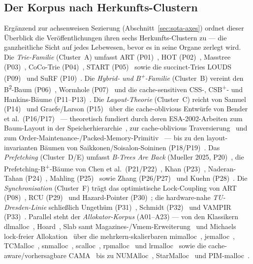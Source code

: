 \subsection{Der Korpus nach Herkunfts-Clustern}\label{ssec:sota-corpus}
Ergänzend zur achsenweisen Sezierung (Abschnitt~\ref{sec:sota-axes}) ordnet dieser Überblick die
Veröffentlichungen ihren sechs Herkunfts-Clustern zu --- die ganzheitliche Sicht auf jedes
Lebewesen, bevor es in seine Organe zerlegt wird. Die \emph{Trie-Familie} (Cluster~A) umfasst ART
(P01)~\cite{leis2013art}, HOT (P02)~\cite{binna2018hot}, Masstree (P03)~\cite{mao2012masstree},
CoCo-Trie (P04)~\cite{boffa2024coco}, START (P05)~\cite{fent2020start} sowie die succinct-Tries
LOUDS (P09)~\cite{jacobson1989louds} und SuRF (P10)~\cite{zhang2018surf}. Die
\emph{Hybrid- und B\textsuperscript{+}-Familie} (Cluster~B) vereint den B\textsuperscript{2}-Baum
(P06)~\cite{schmeisser2022b2tree}, Wormhole (P07)~\cite{wu2019wormhole} und die cache-sensitiven
CSS-, CSB\textsuperscript{+}- und Hankins-Bäume
(P11--P13)~\cite{rao1999css,rao2000csb,hankins2003nodesize}. Die \emph{Layout-Theorie} (Cluster~C)
reicht von Samuel (P14)~\cite{samuel2005procaware} und Graefe/Larson (P15)~\cite{graefe2001btree}
über die cache-oblivious Entwürfe von Bender et
al.\ (P16/P17)~\cite{bender2000cobtree,bender2005coboblivious} --- theoretisch fundiert durch deren
ESA-2002-Arbeiten zum Baum-Layout in der Speicherhierarchie~\cite{bender2002treelayout}, zur
cache-oblivious Traversierung~\cite{bender2002scanning} und zum
Order-Maintenance-/Packed-Memory-Primitiv~\cite{bender2002orderlist} --- bis zu den
layout-invarianten Bäumen von Saikkonen/Soisalon-Soininen
(P18/P19)~\cite{saikkonen2008multilevel,saikkonen2016layout}. Das \emph{Prefetching} (Cluster~D/E)
umfasst \emph{B-Trees Are Back} (Mueller 2025, P20)~\cite{mueller2025btreesback}, die
Prefetching-B\textsuperscript{+}-Bäume von Chen et
al.\ (P21/P22)~\cite{chen2001prefetch,chen2002fractal}, Khan (P23)~\cite{khan2010adaptive},
Naderan-Tahan (P24)~\cite{naderan2016adaptivefilter}, Mahling (P25)~\cite{mahling2025hotpath} sowie
Zhang (P26/P27)~\cite{zhang2024pathprefix,zhang2025hierarchical} und Kuehn
(P28)~\cite{kuehn2023bplustree}. Die \emph{Synchronisation} (Cluster~F) trägt das optimistische
Lock-Coupling von ART (P08)~\cite{leis2016olc}, RCU (P29)~\cite{mckenney2001rcu} und Hazard-Pointer
(P30)~\cite{michael2004hazard}; die hardware-nahe \emph{TU-Dresden-Linie} schließlich Ungethüm
(P31)~\cite{ungethuem2017survey}, Schmidt (P32)~\cite{schmidt2025hbm} und VAMPIR
(P33)~\cite{berthold2023vampir}. Parallel steht der \emph{Allokator-Korpus} (A01--A23) --- von den
Klassikern dlmalloc~\cite{lea1996dlmalloc}, Hoard~\cite{berger2000hoard}, Slab samt
Magazines-/Vmem-Erweiterung~\cite{bonwick1994slab,bonwick2001vmem} und Michaels lock-freier
Allokation~\cite{michael2004lockfree} über die mehrkern-skalierbaren
mimalloc~\cite{leijen2019mimalloc}, jemalloc~\cite{evans2006jemalloc},
TCMalloc~\cite{ghemawat2005tcmalloc}, snmalloc~\cite{lietar2019snmalloc},
scalloc~\cite{aigner2015scalloc}, rpmalloc~\cite{jansson2017rpmalloc} und
lrmalloc~\cite{leite2018lrmalloc} sowie die cache-aware/vorhersagbare CAMA~\cite{herter2011cama} bis
zu NUMAlloc~\cite{yang2023numalloc}, StarMalloc~\cite{reitz2024starmalloc} und
PIM-malloc~\cite{pimmalloc2026}.

